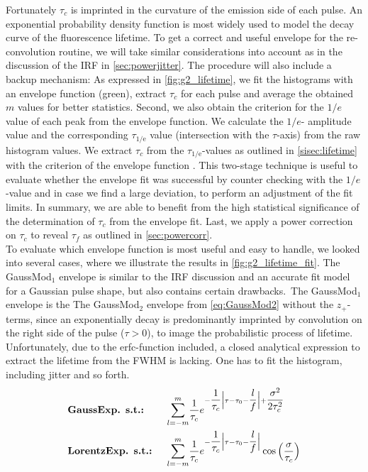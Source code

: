 Fortunately $\tau_c$ is imprinted in the curvature of the emission side \cite{kollner_how_1992,sunney_xie_single-molecule_2002} of each pulse. An exponential probability density function \cite{santori_triggered_2001,beveratos_room_2002} is most widely used to model the decay curve of the fluorescence lifetime. To get a correct and useful envelope for the re-convolution routine, we will take similar considerations into account as in the discussion of the \ac{IRF} in \cref{sec:powerjitter}. The procedure will also include a backup mechanism: As expressed in \cref{fig:g2_lifetime}, we fit the histograms with an envelope function (green), extract $\tau_c$ for each pulse and average the obtained $m$ values for better statistics. Second, we also obtain the criterion for the $1/e$ value of each peak from the envelope function. We calculate the $1/e$- amplitude value and the corresponding $\tau_\mathrm{1/e}$ value (intersection with the $\tau$-axis) from the raw histogram values. We extract $\tau_c$ from the $\tau_\mathrm{1/e}$-values as outlined in \cref{sisec:lifetime} with the criterion of the envelope function . This two-stage technique is useful to evaluate whether the envelope fit was successful by counter checking with the $1/e$-value and in case we find a large deviation, to perform an adjustment of the fit limits. In summary, we are able to benefit from the high statistical significance of the determination of $\tau_c$ from the envelope fit. Last, we apply a power correction on $\tau_c$ to reveal $\tau_f$ as outlined in \cref{sec:powercorr}.\\
To evaluate which envelope function is most useful and easy to handle, we looked into several cases, where we illustrate the results in \cref{fig:g2_lifetime_fit}. The GaussMod$_1$ envelope is similar to the \ac{IRF} discussion and an accurate fit model for a Gaussian pulse shape, but also contains certain drawbacks.~The GaussMod$_1$ envelope is the The GaussMod$_2$ envelope from \cref{eq:GaussMod2} without the $z_{+}$-terms, since an exponentially decay is predominantly imprinted by convolution on the right side of the pulse ($\tau>0$), to image the probabilistic process of lifetime. Unfortunately, due to the erfc-function included, a closed analytical expression to extract the lifetime from the \ac{FWHM} is lacking. One has to fit the histogram, including jitter and so forth.
 \begin{align}
 	&\textrm{\textbf{GaussExp. s.t.: }}&\sum_{l=-m}^m&\dfrac{1}{\tau_c}e^{-\dfrac{1}{\tau_c}\Big|\tau-\tau_0-\dfrac{l}{f}\Big|+\dfrac{\sigma^2}{2\tau_c^2}}\label{eq:taucslopeGauss}\\
 	&\textrm{\textbf{LorentzExp. s.t.: }}&\sum_{l=-m}^m&\dfrac{1}{\tau_c}e^{-\dfrac{1}{\tau_c}\Big|\tau-\tau_0-\dfrac{l}{f}\Big|}\cos\Big(\dfrac{\sigma}{\tau_c}\Big)\label{eq:taucslopeLorentz}
 \end{align}
